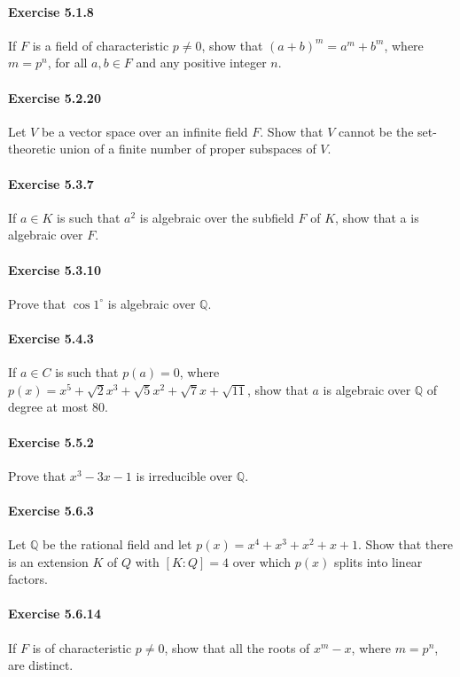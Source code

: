 \documentclass{article}
\begin{document}
\paragraph{Exercise 5.1.8} If $F$ is a field of characteristic $p \neq 0$, show that $(a + b)^m = a^m + b^m$, where $m = p^n$, for all $a, b \in F$ and any positive integer $n$.

\paragraph{Exercise 5.2.20} Let $V$ be a vector space over an infinite field $F$. Show that $V$ cannot be the set-theoretic union of a finite number of proper subspaces of $V$.

\paragraph{Exercise 5.3.7} If $a \in K$ is such that $a^2$ is algebraic over the subfield $F$ of $K$, show that a is algebraic over $F$.

\paragraph{Exercise 5.3.10} Prove that $\cos 1^{\circ}$  is algebraic over $\mathbb{Q}$.

\paragraph{Exercise 5.4.3} If $a \in C$ is such that $p(a) = 0$, where $p(x) = x^5 + \sqrt{2}x^3 + \sqrt{5}x^2 + \sqrt{7}x + \sqrt{11}$, show that $a$ is algebraic over $\mathbb{Q}$ of degree at most 80.

\paragraph{Exercise 5.5.2} Prove that $x^3 - 3x - 1$ is irreducible over $\mathbb{Q}$.

\paragraph{Exercise 5.6.3} Let $\mathbb{Q}$ be the rational field and let $p(x) = x^4 + x^3 + x^2 + x + 1$.  Show that there is an extension $K$ of $Q$ with $[K:Q] = 4$ over which $p(x)$ splits into linear factors.

\paragraph{Exercise 5.6.14} If $F$ is of characteristic $p \neq 0$, show that all the roots of $x^m - x$, where $m = p^n$, are distinct.
\end{document}
